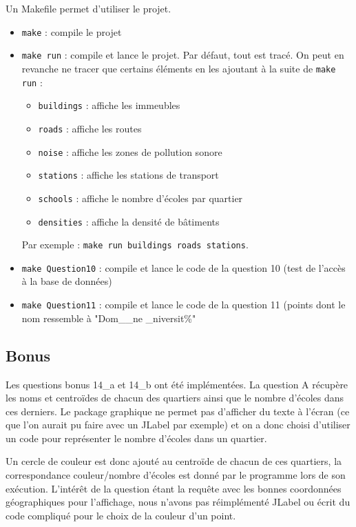 \documentclass[12pt,a4paper]{article}
\begin{document}
Un Makefile permet d'utiliser le projet. 
\begin{itemize}
	\item \verb?make? : compile le projet
    \item \verb?make run? : compile et lance le projet. Par défaut, tout est tracé. On peut en revanche ne tracer que certains éléments en les ajoutant à la suite de \verb?make run? :
		\begin{itemize}
				\item \verb?buildings? : affiche les immeubles
				\item \verb?roads? : affiche les routes
				\item \verb?noise? : affiche les zones de pollution sonore
				\item \verb?stations? : affiche les stations de transport
				\item \verb?schools? : affiche le nombre d'écoles par quartier
				\item \verb?densities? : affiche la densité de bâtiments
		\end{itemize}
		Par exemple : \verb?make run buildings roads stations?.

    \item \verb?make Question10? : compile et lance le code de la question 10 (test de l'accès à la base de données)
    \item \verb?make Question11? : compile et lance le code de la question 11 (points dont le nom ressemble à "Dom\_\_ne \_niversit\%"
\end{itemize}

\subsection{Bonus}

Les questions bonus 14\_a et 14\_b ont été implémentées. La question A récupère les noms et centroïdes de chacun des quartiers ainsi que le nombre d'écoles dans ces derniers. Le package graphique ne permet pas d'afficher du texte à l'écran (ce que l'on aurait pu faire avec un JLabel par exemple) et on a donc choisi d'utiliser un code pour représenter le nombre d'écoles dans un quartier.

Un cercle de couleur est donc ajouté au centroïde de chacun de ces quartiers, la correspondance couleur/nombre d'écoles est donné par le programme lors de son exécution.
L'intérêt de la question étant la requête avec les bonnes coordonnées géographiques pour l'affichage, nous n'avons pas réimplémenté JLabel ou écrit du code compliqué pour le choix de la couleur d'un point.
\end{document}

